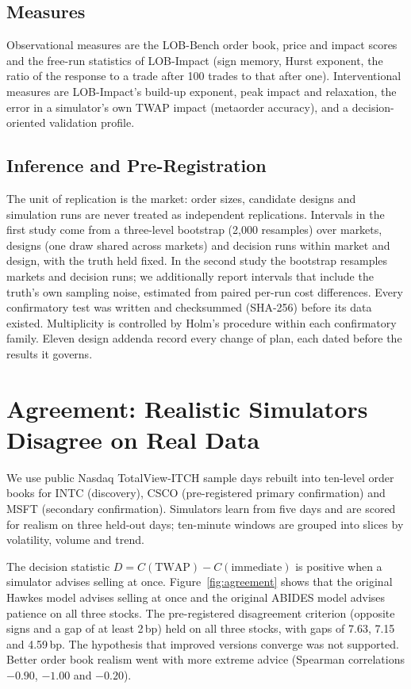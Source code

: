 \documentclass{ieeeaccess}
\newcommand{\bp}{\,bp}
\begin{document}
\subsection{Measures}
Observational measures are the LOB-Bench order book, price and impact scores \cite{nagy2025lobbench} and the free-run
statistics of LOB-Impact \cite{nigmatulin2026lobimpact} (sign memory, Hurst exponent, the ratio of the response to a
trade after 100 trades to that after one). Interventional measures are LOB-Impact's build-up exponent, peak impact and
relaxation, the error in a simulator's own TWAP impact (metaorder accuracy), and a decision-oriented validation profile.

\subsection{Inference and Pre-Registration}
The unit of replication is the market: order sizes, candidate designs and simulation runs are never treated as
independent replications. Intervals in the first study come from a three-level bootstrap (2,000 resamples) over markets,
designs (one draw shared across markets) and decision runs within market and design, with the truth held fixed. In the
second study the bootstrap resamples markets and decision runs; we additionally report intervals that include the
truth's own sampling noise, estimated from paired per-run cost differences. Every confirmatory test was written and
checksummed (SHA-256) before its data existed. Multiplicity is controlled by Holm's procedure within each confirmatory
family. Eleven design addenda record every change of plan, each dated before the results it governs.

\section{Agreement: Realistic Simulators Disagree on Real Data}
\label{sec:agreement}
We use public Nasdaq TotalView-ITCH sample days rebuilt into ten-level order books for INTC (discovery), CSCO
(pre-registered primary confirmation) and MSFT (secondary confirmation). Simulators learn from five days and are scored
for realism on three held-out days; ten-minute windows are grouped into slices by volatility, volume and trend.

The decision statistic $D=C(\mathrm{TWAP})-C(\mathrm{immediate})$ is positive when a simulator advises selling at once.
Figure~\ref{fig:agreement} shows that the original Hawkes model advises selling at once and the original ABIDES model
advises patience on all three stocks. The pre-registered disagreement criterion (opposite signs and a gap of at least
2\bp) held on all three stocks, with gaps of 7.63, 7.15 and 4.59\bp. The hypothesis that improved versions converge was
not supported. Better order book realism went with more extreme advice (Spearman correlations $-0.90$, $-1.00$ and
$-0.20$).
\end{document}
